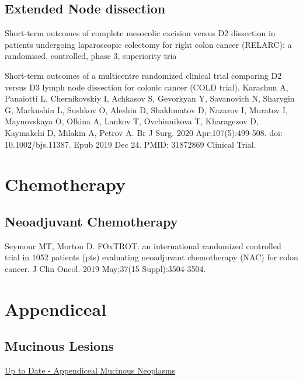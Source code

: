 \documentclass[
]{book}
\begin{document}
\hypertarget{extended-node-dissection}{%
\section{Extended Node dissection}\label{extended-node-dissection}}

Short-term outcomes of complete mesocolic excision versus D2 dissection in patients undergoing laparoscopic colectomy for right colon cancer (RELARC): a randomised, controlled, phase 3, superiority tria

Short-term outcomes of a multicentre randomized clinical trial comparing D2 versus D3 lymph node dissection for colonic cancer (COLD trial).
Karachun A, Panaiotti L, Chernikovskiy I, Achkasov S, Gevorkyan Y, Savanovich N, Sharygin G, Markushin L, Sushkov O, Aleshin D, Shakhmatov D, Nazarov I, Muratov I, Maynovskaya O, Olkina A, Lankov T, Ovchinnikova T, Kharagezov D, Kaymakchi D, Milakin A, Petrov A.
Br J Surg. 2020 Apr;107(5):499-508. doi: 10.1002/bjs.11387. Epub 2019 Dec 24.
PMID: 31872869 Clinical Trial.

\hypertarget{chemotherapy}{%
\chapter{Chemotherapy}\label{chemotherapy}}

\hypertarget{neoadjuvant-chemotherapy}{%
\section{Neoadjuvant Chemotherapy}\label{neoadjuvant-chemotherapy}}

Seymour MT, Morton D. FOxTROT: an international randomized controlled trial in 1052 patients (pts) evaluating neoadjuvant chemotherapy (NAC) for colon cancer. J Clin Oncol. 2019 May;37(15 Suppl):3504-3504.

\hypertarget{appendiceal}{%
\chapter{Appendiceal}\label{appendiceal}}

\hypertarget{mucinous-lesions}{%
\section{Mucinous Lesions}\label{mucinous-lesions}}

\href{https://www.uptodate.com/contents/appendiceal-mucinous-lesions}{Up to Date - Appendiceal Mucinous Neoplasms}
\end{document}
